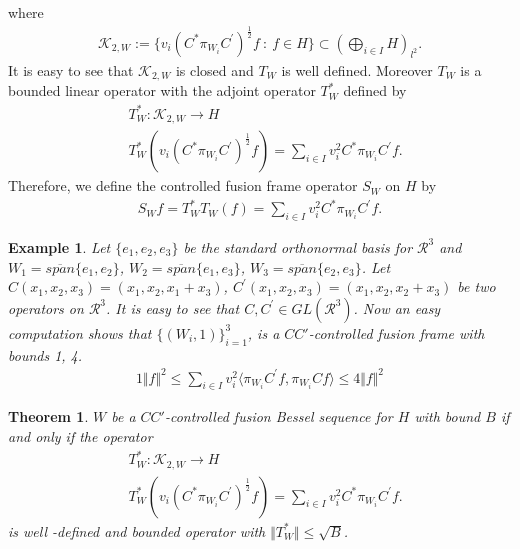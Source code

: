 \documentclass{mfatshort}
\newtheorem{theorem}{Theorem}[section]
\newtheorem{Example}{Example}
\begin{document}
where
\begin{align*}
\mathcal{K}_{2,W}:=\lbrace v_i(C^{*}\pi_{W_{i}} C^{\prime})^{\frac{1}{2}}f \ : \ f\in H\rbrace \subset (\bigoplus_{i \in I} H)_{l^{2}}.
\end{align*}
It is easy to see that $\mathcal{K}_{2,W}$ is closed and $T_{W}$ is well defined. Moreover $T_{W}$ is a bounded linear operator with the adjoint operator $T ^{*}_{W}$ defined by
\begin{align*} 
&T^{*}_{W}:\mathcal{K}_{2,W} \rightarrow H \\
&T ^{*}_{W}(v_i(C^{*}\pi_{W_{i}} C^{\prime})^{\frac{1}{2}}f)=\sum _{i\in I} v_{i}^{2}C^{*}\pi_{W_{i}} C^{\prime}f.
\end{align*}
Therefore, we define the controlled fusion frame operator $S_{W}$ on $H$ by
\begin{align*}
S_{W}f=T ^{*}_{W}T_{W}(f)=\sum _{i\in I} v_{i}^{2}C^{*}\pi_{W_{i}} C^{\prime}f.
\end{align*}
\begin{Example}
Let $\lbrace e_{1},e_{2},e_{3}\rbrace$ be the standard orthonormal basis for $\mathcal{R}^{3}$ and $W_{1}=\overline{span}\lbrace e_{1},e_{2} \rbrace$, $W_{2}=\overline{span}\lbrace e_{1},e_{3} \rbrace$, $W_{3}=\overline{span}\lbrace e_{2},e_{3} \rbrace$. Let
$C(x_{1},x_{2},x_{3})=(x_{1},x_{2},x_{1}+x_{3})$, $C^{\prime}(x_{1},x_{2},x_{3})=(x_{1},x_{2},x_{2}+x_{3})$ be two operators on $\mathcal{R}^{3}$. It is easy to see that $C,C^{\prime}\in GL(\mathcal{R}^{3})$.  Now an easy computation shows that $\lbrace(W_{i},1)\rbrace^{3} _{i=1}$,  is a $CC'$-controlled fusion frame with bounds 1, 4. 
\begin{align*}
1 \Vert f \Vert^{2} \leq \sum _{i\in I} v_{i}^{2} \langle \pi_{W_{i}} C^{\prime}f,\pi_{W_{i}} Cf \rangle  \leq 4 \Vert f\Vert^{2}
\end{align*}
\end{Example}
\begin{theorem}\label{1}
$W$ be a  $CC'$-controlled fusion Bessel sequence  for $H$  with bound $B$ if and only if the operator
\begin{align*}
&T^{*}_{W}:\mathcal{K}_{2,W} \rightarrow H \\
&T ^{*}_{W}(v_i(C^{*}\pi_{W_{i}} C^{\prime})^{\frac{1}{2}}f)=\sum _{i\in I} v_{i}^{2}C^{*}\pi_{W_{i}} C^{\prime}f.
\end{align*}
is well -defined and bounded operator with $\Vert T^{*}_{W} \Vert \leq \sqrt{B}$.\\
\end{theorem}
\end{document}
